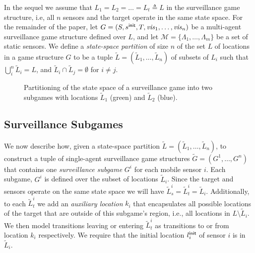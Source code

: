 In the sequel we assume that $L_1 = L_2 = \dots = L_t \triangleq L$  in the surveillance game structure, i.e, all $n$ sensors and the target operate in the same state space. For the remainder of the paper, let $G=(S,s^{\mathsf{init}},T,\mathit{vis}_1,\ldots,\mathit{vis}_n)$ be a multi-agent surveillance game structure  defined over  $L$, and let $\mathcal M = \{\Lambda_1,\dots,\Lambda_m\}$ be a set of static sensors. We define a  \emph{state-space partition} of size $n$ of the set $L$ of locations in a game structure $G$ to be a tuple $\widetilde L =  (\widetilde L_1,\ldots,\widetilde L_n)$ of subsets of $L_i$ such that  $\bigcup_i^n \widetilde L_i = L $, and $\widetilde L_i \cap \widetilde L_j  = \emptyset$ for $i \neq j$. 


\begin{figure}
{}
\hspace{0.2cm}

\caption{Partitioning of the state space of a surveillance game into two subgames with locations $\widetilde{L}_1$ (green) and $\widetilde{L}_2$ (blue). }
\label{fig:simple-dist-game}
\vspace{-0.6cm}
\end{figure}

\subsection{Surveillance Subgames}\label{sec:subgames}
We now describe how, given a state-space partition $\widetilde L =  (\widetilde L_1,\ldots,\widetilde L_n)$, to construct a tuple of single-agent surveillance game structures $\widetilde G = (G^1,\ldots,G^n)$ that contains one  \emph{surveillance subgame} $G^i$ for each mobile sensor  $i$. Each subgame, $G^i$ is defined over the subset of locations $\widetilde{L}_i$. Since the target and sensors operate on the same state space we will have $\widetilde{L}^i_s = \widetilde{L}^i_t = \widetilde{L}_i$. Additionally, to each $\widetilde{L}^i_t$ we add an \emph{auxiliary location} $k_i$ that encapsulates all possible locations of the target that are outside of this subgame's region, i.e., all locations in $L \setminus \widetilde{L}_i$.  We then model transitions leaving or entering $\widetilde{L}^i_t$ as transitions to or from location $k_i$ respectively.
We require that the initial location $l_i^{\mathsf{init}}$ of sensor $i$ is in $\widetilde{L}_i$.


